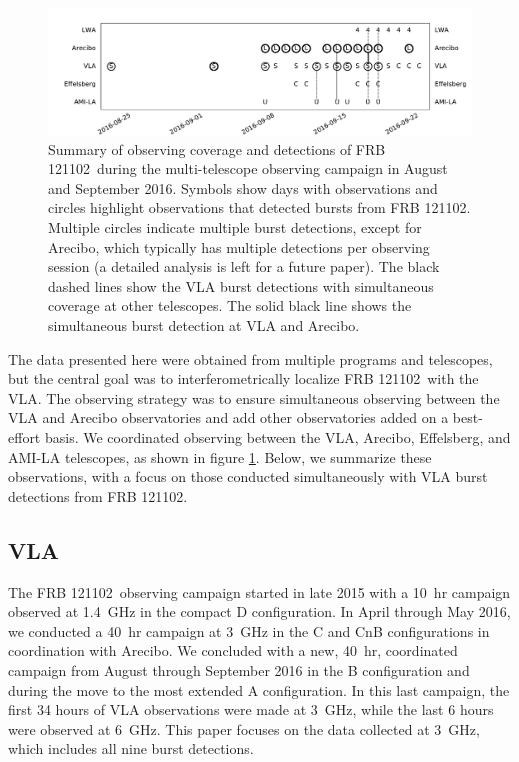 \documentclass[twocolumn]{aastex61}
\newcommand{\frb}{FRB 121102}
\begin{document}
\begin{figure}[t]
\begin{center}
\includegraphics[width=2\columnwidth]{timeline}
\caption{Summary of observing coverage and detections of \frb\ during the multi-telescope observing campaign in August and September 2016. Symbols show days with observations and circles highlight observations that detected bursts from \frb. Multiple circles indicate multiple burst detections, except for Arecibo, which typically has multiple detections per observing session (a detailed analysis is left for a future paper). The black dashed lines show the VLA burst detections with simultaneous coverage at other telescopes. The solid black line shows the simultaneous burst detection at VLA and Arecibo.
\label{fig:multi}}
\end{center}
\end{figure}

The data presented here were obtained from multiple programs and telescopes, but the central goal was to interferometrically localize \frb\ with the VLA. The observing strategy was to ensure simultaneous observing between the VLA and Arecibo observatories and add other observatories added on a best-effort basis. We coordinated observing between the VLA, Arecibo, Effelsberg, and AMI-LA telescopes, as shown in figure \ref{fig:multi}. Below, we summarize these observations, with a focus on those conducted simultaneously with VLA burst detections from \frb.

\subsection{VLA}
The \frb\ observing campaign started in late 2015 with a 10~hr campaign observed at 1.4~GHz in the compact D configuration. In April through May 2016, we conducted a 40~hr campaign at 3~GHz in the C and CnB configurations in coordination with Arecibo. We concluded with a new, 40~hr, coordinated campaign from August through September 2016 in the B configuration and during the move to the most extended A configuration. In this last campaign, the first 34 hours of VLA observations were made at 3~GHz, while the last 6 hours were observed at 6~GHz. This paper focuses on the data collected at 3~GHz, which includes all nine burst detections.
\end{document}
